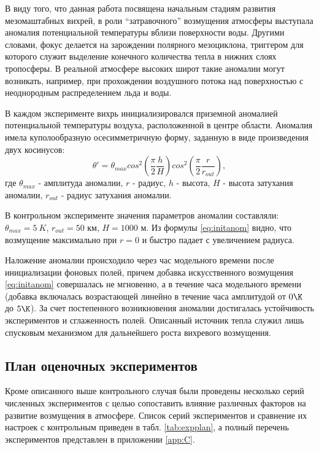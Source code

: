 В виду того, что данная работа посвящена начальным стадиям развития мезомаштабных вихрей, в роли “затравочного” возмущения атмосферы выступала аномалия потенциальной температуры вблизи поверхности воды. Другими словами, фокус делается на зарождении полярного мезоциклона, триггером для которого служит выделение конечного количества тепла в нижних слоях тропосферы. В реальной атмосфере высоких широт такие аномалии могут возникать, например, при прохождении воздушного потока над поверхностью с неоднородным распределением льда и воды.

В каждом эксперименте вихрь инициализировался приземной аномалией потенциальной температуры воздуха, расположенной в центре области. Аномалия имела куполообразную осесимметричную форму, заданную в виде произведения двух косинусов:
\begin{equation}\label{eq:initanom}
\theta'=\theta_{max}cos^2\left(\frac{\pi}{2}\frac{h}{H}\right) cos^2\left(\frac{\pi}{2}\frac{r}{r_{out}}\right),
\end{equation}
где $\theta_{max}$ - амплитуда аномалии, $r$ - радиус, $h$ - высота, $H$ - высота затухания аномалии, $r_{out}$ - радиус затухания аномалии.

В контрольном эксперименте значения параметров аномалии составляли: $\theta_{max}=5~K$, $r_{out}=50$ км, $H=1000$ м. Из формулы \eqref{eq:initanom} видно, что возмущение максимально при $r=0$ и быстро падает с увеличением радиуса.

Наложение аномалии происходило через час модельного времени после инициализации фоновых полей, причем добавка искусственного возмущения \eqref{eq:initanom} совершалась не мгновенно, а в течение часа модельного времени (добавка включалась возрастающей линейно в течение часа амплитудой от $0\K$ до $5\K$). За счет постепенного возникновения аномалии достигалась устойчивость экспериментов и сглаженность полей. 
Описанный источник тепла служил лишь спусковым механизмом для дальнейшего роста вихревого возмущения.

\subsection{План оценочных экспериментов}
\label{sec:expplan}
Кроме описанного выше контрольного случая были проведены несколько серий численных экспериментов с целью сопоставить влияние различных факторов на развитие возмущения в атмосфере. Список серий экспериментов и сравнение их настроек с контрольным приведен в табл. \ref{tab:expplan}, а полный перечень экспериментов представлен в приложении \ref{app:C}.

